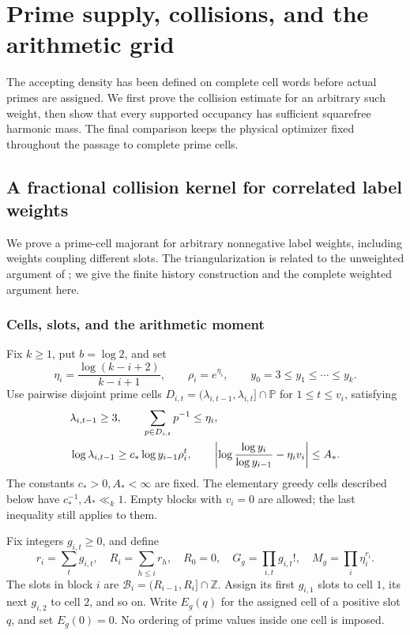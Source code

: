\section{Prime supply, collisions, and the arithmetic grid}
\label{app:arithmetic-details}

The accepting density has been defined on complete cell words before
actual primes are assigned. We first prove the collision estimate for
an arbitrary such weight, then show that every supported occupancy has
sufficient squarefree harmonic mass. The final comparison keeps the
physical optimizer fixed throughout the passage to complete prime cells.

\subsection{A fractional collision kernel for correlated label weights}
\label{sec:correlated-collision-kernel}
We prove a prime-cell majorant for arbitrary nonnegative label weights,
including weights coupling different slots. The triangularization is
related to the unweighted argument of \cite[Section~7.1]{Kouk}; we give
the finite history construction and the complete weighted argument here.

\subsubsection{Cells, slots, and the arithmetic moment}
Fix $k\ge1$, put $b=\log2$, and set
\[
 \eta_i=\frac{\log(k-i+2)}{k-i+1},\qquad \rho_i=e^{\eta_i},
 \qquad y_0=3\le y_1\le\cdots\le y_k.
\]
Use pairwise disjoint prime cells
$D_{i,t}=(\lambda_{i,t-1},\lambda_{i,t}]\cap\mathbb P$
for $1\le t\le v_i$, satisfying
\begin{align}
 &\lambda_{i,t-1}\ge3,\qquad
   \sum_{p\in D_{i,t}}p^{-1}\le\eta_i,\notag\\
 &\log\lambda_{i,t-1}\ge c_*\log y_{i-1}\rho_i^t,\qquad
 \left|\log\frac{\log y_i}{\log y_{i-1}}-\eta_iv_i\right|
       \le A_* .                                      \label{eq:cc-cell}
\end{align}
The constants $c_*>0,A_*<\infty$ are fixed. The elementary greedy
cells described below have $c_*^{-1},A_*\ll_k1$. Empty blocks with
$v_i=0$ are allowed; the last inequality still applies to them.

Fix integers $g_{i,t}\ge0$, and define
\[
 r_i=\sum_tg_{i,t},\quad R_i=\sum_{h\le i}r_h,\quad R_0=0,
 \quad G_g=\prod_{i,t}g_{i,t}!,\quad M_g=\prod_i\eta_i^{r_i}.
\]
The slots in block $i$ are $\mathcal B_i=(R_{i-1},R_i]\cap\mathbb Z$.
Assign its first $g_{i,1}$ slots to cell $1$, its next $g_{i,2}$
to cell $2$, and so on. Write $E_g(q)$ for the assigned cell of a
positive slot $q$, and set $E_g(0)=0$. No ordering of prime values
inside one cell is imposed.


